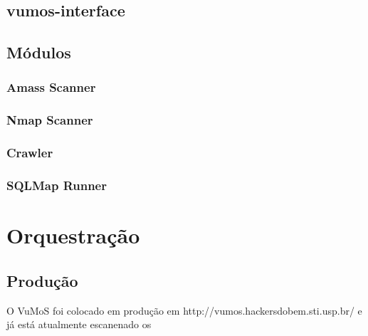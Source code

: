     \subsection{vumos-interface}
    \subsection{Módulos}
        \subsubsection{Amass Scanner}
        \subsubsection{Nmap Scanner}
        \subsubsection{Crawler}
        \subsubsection{SQLMap Runner}

\section{Orquestração}
    
    \subsection{Produção}
    O VuMoS foi colocado em produção em http://vumos.hackersdobem.sti.usp.br/ e já está atualmente escanenado os  

